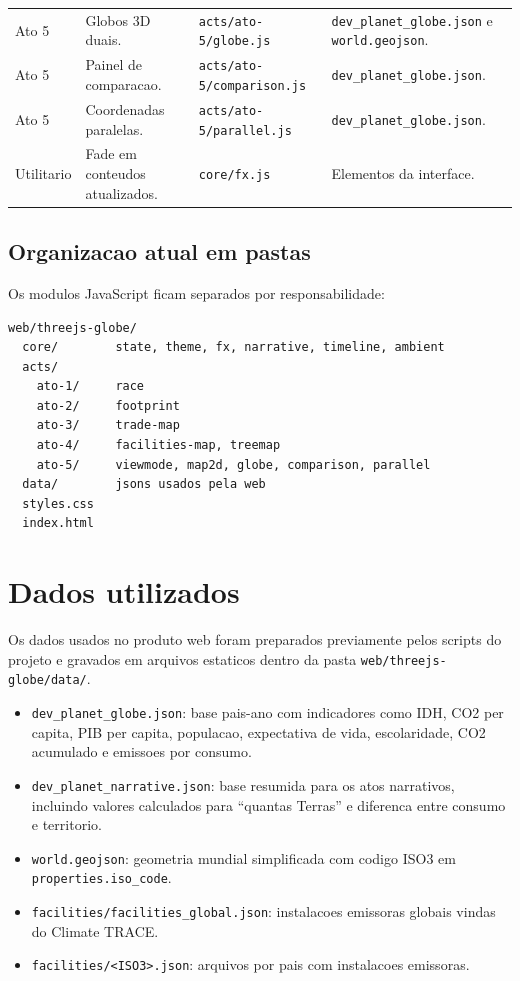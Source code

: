 \documentclass[12pt,a4paper]{article}
\begin{document}
\begin{longtable}{>{\raggedright\arraybackslash}p{2.4cm}>{\raggedright\arraybackslash}p{4.2cm}>{\raggedright\arraybackslash}p{4.5cm}>{\raggedright\arraybackslash}p{3.1cm}}
Ato 5 & Globos 3D duais. & \texttt{acts/ato-5/globe.js} & \texttt{dev\_planet\_globe.json} e \texttt{world.geojson}. \\
Ato 5 & Painel de comparacao. & \texttt{acts/ato-5/comparison.js} & \texttt{dev\_planet\_globe.json}. \\
Ato 5 & Coordenadas paralelas. & \texttt{acts/ato-5/parallel.js} & \texttt{dev\_planet\_globe.json}. \\
Utilitario & Fade em conteudos atualizados. & \texttt{core/fx.js} & Elementos da interface. \\
\bottomrule
\end{longtable}

\subsection{Organizacao atual em pastas}

Os modulos JavaScript ficam separados por responsabilidade:

\begin{verbatim}
web/threejs-globe/
  core/        state, theme, fx, narrative, timeline, ambient
  acts/
    ato-1/     race
    ato-2/     footprint
    ato-3/     trade-map
    ato-4/     facilities-map, treemap
    ato-5/     viewmode, map2d, globe, comparison, parallel
  data/        jsons usados pela web
  styles.css
  index.html
\end{verbatim}

\section{Dados utilizados}

Os dados usados no produto web foram preparados previamente pelos scripts do projeto e gravados em arquivos estaticos dentro da pasta \texttt{web/threejs-globe/data/}.

\begin{itemize}
  \item \texttt{dev\_planet\_globe.json}: base pais-ano com indicadores como IDH, CO2 per capita, PIB per capita, populacao, expectativa de vida, escolaridade, CO2 acumulado e emissoes por consumo.
  \item \texttt{dev\_planet\_narrative.json}: base resumida para os atos narrativos, incluindo valores calculados para ``quantas Terras'' e diferenca entre consumo e territorio.
  \item \texttt{world.geojson}: geometria mundial simplificada com codigo ISO3 em \texttt{properties.iso\_code}.
  \item \texttt{facilities/facilities\_global.json}: instalacoes emissoras globais vindas do Climate TRACE.
  \item \texttt{facilities/<ISO3>.json}: arquivos por pais com instalacoes emissoras.
\end{itemize}
\end{document}
